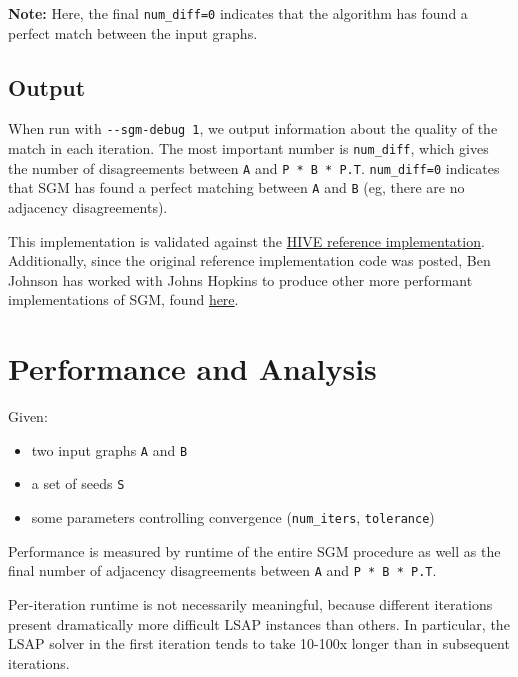 \documentclass[10pt,oneside]{memoir}
\providecommand{\tightlist}{%
  \setlength{\itemsep}{0pt}\setlength{\parskip}{0pt}}
\begin{document}
\textbf{Note:} Here, the final \texttt{num\_diff=0} indicates that the
algorithm has found a perfect match between the input graphs.

\hypertarget{output-3}{%
\subsection{Output}\label{output-3}}

When run with \texttt{-\/-sgm-debug\ 1}, we output information about the
quality of the match in each iteration. The most important number is
\texttt{num\_diff}, which gives the number of disagreements between
\texttt{A} and \texttt{P\ *\ B\ *\ P.T}. \texttt{num\_diff=0} indicates
that SGM has found a perfect matching between \texttt{A} and \texttt{B}
(eg, there are no adjacency disagreements).

This implementation is validated against the
\href{https://gitlab.hiveprogram.com/ggillary/seeded_graph_matching_brain_connectome/blob/master/sgm.py}{HIVE
reference implementation}. Additionally, since the original reference
implementation code was posted, Ben Johnson has worked with Johns
Hopkins to produce other more performant implementations of SGM, found
\href{https://github.com/bkj/sgm/tree/v2}{here}.

\hypertarget{performance-and-analysis-7}{%
\section{Performance and Analysis}\label{performance-and-analysis-7}}

Given:

\begin{itemize}
\tightlist
\item
  two input graphs \texttt{A} and \texttt{B}
\item
  a set of seeds \texttt{S}
\item
  some parameters controlling convergence (\texttt{num\_iters},
  \texttt{tolerance})
\end{itemize}

Performance is measured by runtime of the entire SGM procedure as well
as the final number of adjacency disagreements between \texttt{A} and
\texttt{P\ *\ B\ *\ P.T}.

Per-iteration runtime is not necessarily meaningful, because different
iterations present dramatically more difficult LSAP instances than
others. In particular, the LSAP solver in the first iteration tends to
take 10-100x longer than in subsequent iterations.
\end{document}
